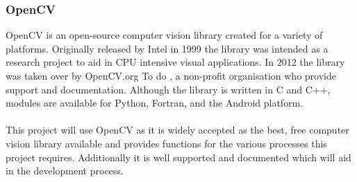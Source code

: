 	\subsubsection{OpenCV}
		OpenCV is an open-source computer vision library created for a variety of platforms. Originally released by Intel in 1999  the library was intended as a research project to aid in CPU intensive visual applications. In 2012 the library was taken over by OpenCV.org To do , a non-profit organisation who provide support and  documentation. Although the library is written in C and C++, modules are available for Python, Fortran, and the Android platform.
		\\\\
		This project will use OpenCV as it is widely accepted as the best, free computer vision library available and provides functions for the various processes this project  requires. Additionally it is well supported and documented which will aid in the development process.
